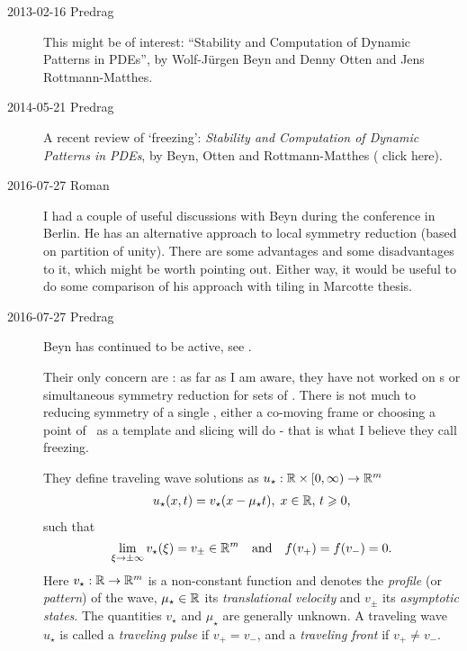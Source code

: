 \begin{description}
\item[2013-02-16 Predrag]
{This} might be of interest: ``Stability and
Computation of Dynamic Patterns in PDEs'', by Wolf-J\"urgen Beyn and
Denny Otten and Jens Rottmann-Matthes.

\item[2014-05-21 Predrag]
A recent review of `freezing': {\em Stability and
    Computation of Dynamic Patterns in PDEs}, by Beyn, Otten and
    Rottmann-Matthes
    ( {click here}).

\item[2016-07-27 Roman]
I had a couple of useful discussions with Beyn during the conference in
Berlin. He has an alternative approach to local symmetry reduction (based
on partition of unity). There are some advantages and some
disadvantages to it, which might be worth pointing out. Either way, it
would be useful to do some comparison of his approach with tiling in
Marcotte thesis.

\item[2016-07-27 Predrag]
Beyn has continued to be active, see .

Their only concern are \reqva: as far as I am aware, they have not
worked on \rpo s or simultaneous symmetry reduction for
sets of \reqva. There is not much to reducing symmetry of a single \reqv,
either a co-moving frame or choosing a point of \reqv\ as a template and slicing
will do - that is what I believe they call freezing.

They define {traveling wave} solutions as
$u_{\star}:\mathbb{R}\times[0,\infty)\rightarrow\mathbb{R}^m$
\begin{equation}
  \begin{aligned}
  \label{equ:2.2}
    u_{\star}(x,t) = v_{\star}(x-\mu_{\star}t),\;x\in\mathbb{R},\,t\geqslant 0,
  \end{aligned}
\end{equation}
such that
\begin{equation}
  \label{equ:2.2.1}
  \lim_{\xi\to\pm\infty}v_{\star}(\xi)=v_{\pm}\in\mathbb{R}^m\quad\text{and}\quad
  f(v_{+})=f(v_{-})=0.
\end{equation}
Here $v_{\star}:\mathbb{R}\rightarrow\mathbb{R}^m$ is a non-constant function
and denotes the \emph{profile} (or \emph{pattern}) of the wave,
$\mu_{\star}\in\mathbb{R}$ its \emph{translational velocity} and $v_{\pm}$
its \emph{asymptotic states}. The quantities $v_{\star}$ and
$\mu_{\star}$ are generally unknown.  A traveling wave
$u_{\star}$ is called a \emph{traveling pulse} if $v_{+}=v_{-}$,
and a \emph{traveling front} if $v_{+}\neq v_{-}$.


\end{description}
